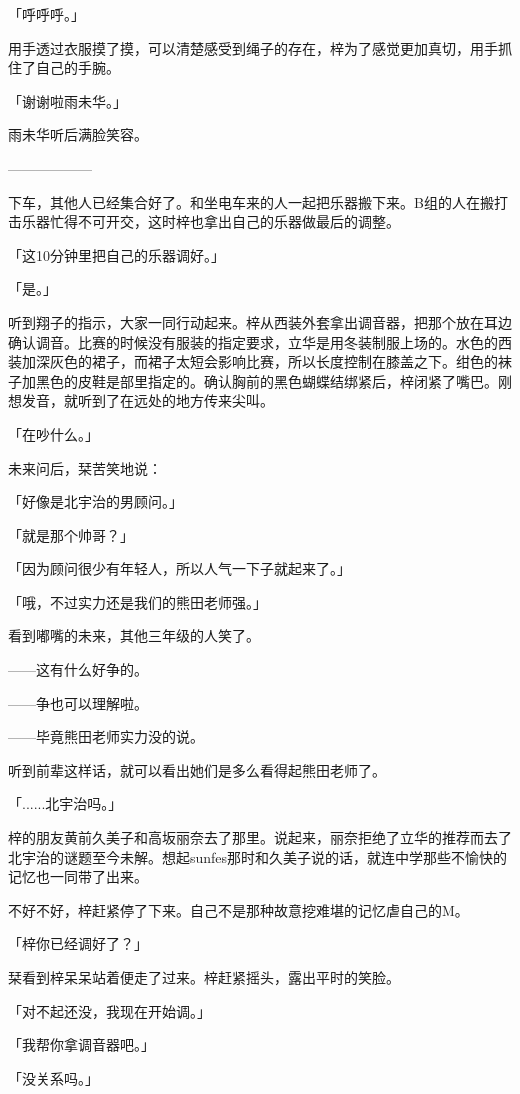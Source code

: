 \documentclass[UTF8]{ctexart}
\begin{document}
    「呼呼呼。」

    用手透过衣服摸了摸，可以清楚感受到绳子的存在，梓为了感觉更加真切，用手抓住了自己的手腕。

    「谢谢啦雨未华。」

    雨未华听后满脸笑容。

    ——————

    下车，其他人已经集合好了。和坐电车来的人一起把乐器搬下来。B组的人在搬打击乐器忙得不可开交，这时梓也拿出自己的乐器做最后的调整。

    「这10分钟里把自己的乐器调好。」

    「是。」

    听到翔子的指示，大家一同行动起来。梓从西装外套拿出调音器，把那个放在耳边确认调音。比赛的时候没有服装的指定要求，立华是用冬装制服上场的。水色的西装加深灰色的裙子，而裙子太短会影响比赛，所以长度控制在膝盖之下。绀色的袜子加黑色的皮鞋是部里指定的。确认胸前的黑色蝴蝶结绑紧后，梓闭紧了嘴巴。刚想发音，就听到了在远处的地方传来尖叫。

    「在吵什么。」

    未来问后，栞苦笑地说：

    「好像是北宇治的男顾问。」

    「就是那个帅哥？」

    「因为顾问很少有年轻人，所以人气一下子就起来了。」

    「哦，不过实力还是我们的熊田老师强。」

    看到嘟嘴的未来，其他三年级的人笑了。

    ——这有什么好争的。

    ——争也可以理解啦。

    ——毕竟熊田老师实力没的说。

    听到前辈这样话，就可以看出她们是多么看得起熊田老师了。

    「......北宇治吗。」

    梓的朋友黄前久美子和高坂丽奈去了那里。说起来，丽奈拒绝了立华的推荐而去了北宇治的谜题至今未解。想起sunfes那时和久美子说的话，就连中学那些不愉快的记忆也一同带了出来。

    不好不好，梓赶紧停了下来。自己不是那种故意挖难堪的记忆虐自己的M。

    「梓你已经调好了？」

    栞看到梓呆呆站着便走了过来。梓赶紧摇头，露出平时的笑脸。

    「对不起还没，我现在开始调。」

    「我帮你拿调音器吧。」

    「没关系吗。」
\end{document}

